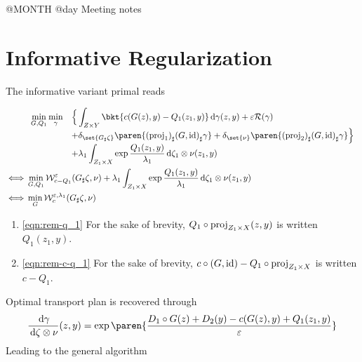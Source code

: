 \documentclass[11pt,a4paper]{article}
\begin{document}

{\Huge @MONTH @day Meeting notes}

\section{Informative Regularization}
The informative variant primal reads

\begin{align}
    & \begin{array}{*2{>{\displaystyle}l}}
        \min_{G, Q_1} \min_{\gamma} &\Big\{\int_{\ZY}{\bkt{c(G(z), y) - Q_1(z_1, y)}\d \gamma(z, y)}  + \eps \R(\gamma) \\
                                    &+ \delta_{\set{\pf{G}{\zeta}}}\paren{\pf{( \proj{1} )}{\pf{(G, \id)}{\gamma}}} + \delta_{\set{\nu}}\paren{\pf{( \proj{2} )}{\pf{(G, \id)}{\gamma}}}\Big\} \\
                                    & + \lambda_1 \int_{\ZAX}{\exp{\frac{Q_1(z_1, y)}{\lambda_1}} \d \oprod{\zeta_1}{\nu} (z_1, y)}
        \end{array} \label{eqn:rem-q_1}\\
    \iff & \min_{G, Q_1} \W_{c - Q_1}^{\eps}(\pf{G}{\zeta}, \nu)+ \lambda_1 \int_{\ZAX}{\exp{\frac{Q_1(z_1, y)}{\lambda_1}} \d \oprod{\zeta_1}{\nu} (z_1, y)} \label{eqn:rem-c-q_1}\\
    \iff & \min_{G} \Wice(\pf{G}\zeta, \nu)
\end{align}

\begin{rems}
    \begin{enumerate}
        \item
            \eqref{eqn:rem-q_1} For the sake of brevity, $Q_1 \circ {{\mathrm{proj}}_{Z_1\times X}}(z, y)$ is written  $Q_1(z_1, y)$.
        \item
            \eqref{eqn:rem-c-q_1} For the sake of brevity, $c \circ (G, \text{\rmfamily id}) - Q_1 \circ {{\mathrm{proj}}_{Z_1\times X}}$ is written $c - Q_1$.
    \end{enumerate}
\end{rems}

Optimal transport plan is recovered through
\begin{align}
    \label{eqn:primal-dual-info-rotgan}
    \radon{\gamma}{\zetaxnu}(z,y)
                      &=\exp\paren{\frac{D_1 \circ G(z) + D_2(y) - c(G(z), y) + Q_1(z_1, y)}{\eps}}  \\
\end{align}
Leading to the general algorithm
\end{document}
